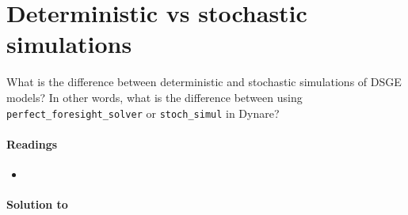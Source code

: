 \section[Deterministic vs stochastic simulations]{Deterministic vs stochastic simulations\label{ex:SimulationsDeterministicStochastic}}
What is the difference between deterministic and stochastic simulations of DSGE models?
In other words, what is the difference between using \texttt{perfect\_foresight\_solver} or \texttt{stoch\_simul} in Dynare?

\paragraph{Readings}
\begin{itemize}
\item \textcite{Mutschler_2023_UnderstandingDeterministicSimulations}
\end{itemize}

\begin{solution}\textbf{Solution to }
\ifDisplaySolutions%

\fi
\newpage
\end{solution}